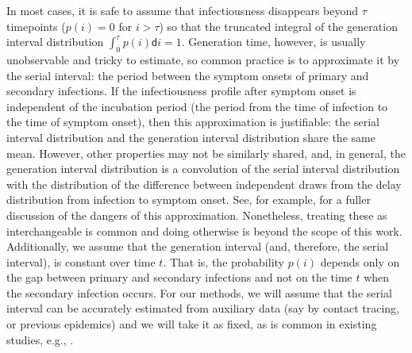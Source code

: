 \documentclass[10pt,letterpaper]{article}
\def\diff{\mathsf{d}}
\newcommand{\citep}[1]{\cite{#1}}
\begin{document}
In most cases, it is safe to assume that infectiousness disappears beyond 
$\tau$ timepoints ($p(i) = 0$ for $i > \tau$) so that the truncated integral 
of the generation interval distribution $\int_0^\tau p(i)\diff i = 1$.
Generation time, however, is usually unobservable and tricky to estimate, so
common practice is to approximate it by the serial interval: the period between
the symptom onsets of primary and secondary infections. If the infectiousness
profile after symptom onset is independent of the incubation period (the period
from the time of infection to the time of symptom onset), then this
approximation is justifiable: the serial interval distribution and the
generation interval distribution share the same mean. However, other properties
may not be similarly shared, and, in general, the generation interval
distribution is a convolution of the serial interval distribution with the
distribution of the difference between independent draws from the delay
distribution from infection to symptom onset. See, for example,
\cite{gostic2020practical} for a fuller discussion of the dangers of this
approximation. Nonetheless, treating these as interchangeable is common
\citep{cori2013new} and doing otherwise is beyond the scope of this work. 
Additionally, we assume that the generation interval (and, therefore, the 
serial interval), is constant over time $t$. That is, the probability $p(i)$ 
depends only on the gap between primary and secondary infections and not on 
the time $t$ when the secondary infection occurs. For our methods, we will 
assume that the serial interval can be accurately estimated from auxiliary 
data (say by contact tracing, or previous epidemics) and we will take it as 
fixed, as is common in existing studies, e.g., 
\cite{cori2013new,abry2020spatial,pascal2022nonsmooth}.
\end{document}
